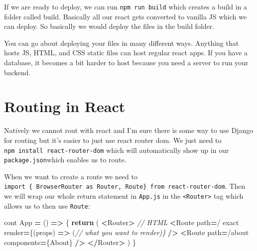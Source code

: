 \documentclass[
]{report}
\newenvironment{Shaded}{\begin{snugshade}}{\end{snugshade}}
\newcommand{\CommentTok}[1]{\textcolor[rgb]{0.56,0.35,0.01}{\textit{#1}}}
\newcommand{\ControlFlowTok}[1]{\textcolor[rgb]{0.13,0.29,0.53}{\textbf{#1}}}
\newcommand{\KeywordTok}[1]{\textcolor[rgb]{0.13,0.29,0.53}{\textbf{#1}}}
\newcommand{\NormalTok}[1]{#1}
\newcommand{\OperatorTok}[1]{\textcolor[rgb]{0.81,0.36,0.00}{\textbf{#1}}}
\newcommand{\StringTok}[1]{\textcolor[rgb]{0.31,0.60,0.02}{#1}}
\begin{document}
If we are ready to deploy, we can run \texttt{npm\ run\ build} which creates a build in
a folder called build. Basically all our react gets converted to vanilla JS
which we can deploy. So basically we would deploy the files in the build
folder.

You can go about deploying your files in many different ways. Anything that
hosts JS, HTML, and CSS static files can host regular react apps. If you have a
database, it becomes a bit harder to host because you need a server to run your
backend.

\hypertarget{routing-in-react}{%
\chapter{Routing in React}\label{routing-in-react}}

Natively we cannot rout with react and I'm sure there is some way to use Django
for routing but it's easier to just use react router dom. We just need to \texttt{npm\ install\ react-router-dom} which will automatically show up in our \texttt{package.json}which enables us to route.

When we want to create a route we need to \texttt{import\ \{\ BrowserRouter\ as\ Router,\ Route\}\ from\ \textquotesingle{}react-router-dom}. Then we will wrap our whole return statement in
\texttt{App.js} in the \texttt{\textless{}Router\textgreater{}} tag which allows us to then use \texttt{Route}:

\begin{Shaded}
\begin{Highlighting}[]
\NormalTok{cont App }\OperatorTok{=}\NormalTok{ () }\KeywordTok{=\textgreater{}}\NormalTok{ \{}
    \ControlFlowTok{return}\NormalTok{ (}
        \OperatorTok{\textless{}}\NormalTok{Router}\OperatorTok{\textgreater{}}
            \CommentTok{// HTML}
            \OperatorTok{\textless{}}\NormalTok{Route }
\NormalTok{                path}\OperatorTok{=}\StringTok{\textquotesingle{}/\textquotesingle{}} 
\NormalTok{                exact }
\NormalTok{                render}\OperatorTok{=}\NormalTok{\{(props) }\KeywordTok{=\textgreater{}}\NormalTok{ (}\CommentTok{// what you want to render)\}}
            \OperatorTok{/\textgreater{}}
            \OperatorTok{\textless{}}\NormalTok{Route path}\OperatorTok{=}\StringTok{\textquotesingle{}/about\textquotesingle{}}\NormalTok{ components}\OperatorTok{=}\NormalTok{\{About\} }\OperatorTok{/\textgreater{}}
        \OperatorTok{\textless{}/}\NormalTok{Router}\OperatorTok{\textgreater{}}
\NormalTok{    )}
\NormalTok{\}}
\end{Highlighting}
\end{Shaded}
\end{document}
